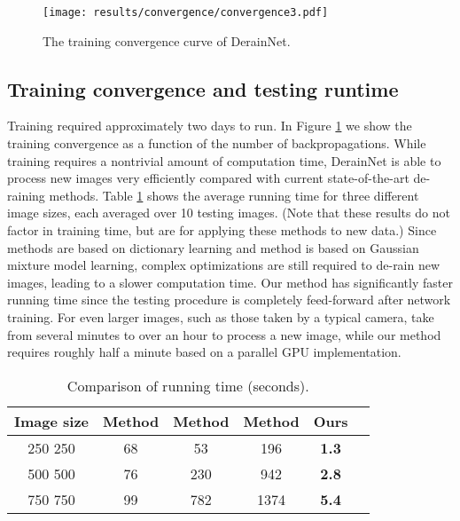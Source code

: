 \documentclass[journal]{IEEEtran}
\begin{document}
\begin{figure}
\centering
\texttt{[image: results/convergence/convergence3.pdf]}
\caption{The training convergence curve of DerainNet.}\label{fig.convergence}
\end{figure}

\subsection{Training convergence and testing runtime}
Training required approximately two days to run. In Figure \ref{fig.convergence} we show the training convergence as a function of the number of backpropagations.
While training requires a nontrivial amount of computation time, DerainNet is able to process new images very efficiently compared with current state-of-the-art de-raining methods. Table \ref{tab.runtime} shows the average running time for three different image sizes, each averaged over 10 testing images. (Note that these results do not factor in training time, but are for applying these methods to new data.) Since methods \cite{13,16} are based on dictionary learning and method \cite{34} is based on Gaussian mixture model learning, complex optimizations are still required to de-rain new images, leading to a slower computation time. Our method has significantly faster running time since the testing procedure is completely feed-forward after network training. For even larger images, such as those taken by a typical camera, \cite{13,16,34} take from several minutes to over an hour to process a new image, while our method requires roughly half a minute based on a parallel GPU implementation.
\begin{table}
\caption{Comparison of running time (seconds).}
\label{tab.runtime}
\centering
\def\arraystretch{1.25}
\begin{tabular}{|c|c|c|c|c|c|}
\hline
  Image size& Method \cite{13} & Method \cite{16} & Method \cite{34} &Ours\\
\hline
250  250& 68 & 53 & 196  &\textbf{1.3}\\
\hline
500  500 & 76 &  230   &  942  &\textbf{2.8}\\
\hline
750  750   &  99  & 782 &  1374  & \textbf{5.4}\\
\hline
\end{tabular}
\end{table}
\end{document}
